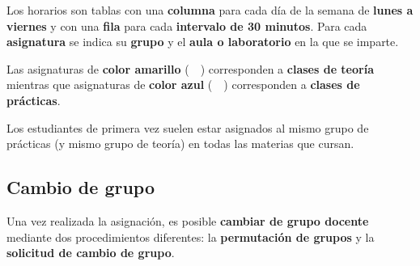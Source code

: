 Los horarios son tablas con una \textbf{columna} para cada día de la semana de \textbf{lunes a viernes} y con una \textbf{fila} para cada \textbf{intervalo de 30 minutos}. Para cada \textbf{asignatura} se indica su \textbf{grupo} y el \textbf{aula o laboratorio} en la que se imparte.

\FloatBarrier
\begin{figure}[htp]
    \centering
\end{figure}
\FloatBarrier

\begin{infoBox}
    Las asignaturas de \textbf{color amarillo} (~\textcolor{colorTimetableTheory}{}~) corresponden a \textbf{clases de teoría} mientras que asignaturas de \textbf{color azul} (~\textcolor{colorTimetablePractice}{}~) corresponden a \textbf{clases de prácticas}.  
\end{infoBox}

\begin{curiosityBox}
    Los estudiantes de primera vez suelen estar asignados al mismo grupo de prácticas (y mismo grupo de teoría) en todas las materias que cursan.
\end{curiosityBox}

\subsection{Cambio de grupo}

Una vez realizada la asignación, es posible \textbf{cambiar de grupo docente} mediante dos procedimientos diferentes: la \textbf{permutación de grupos} y la \textbf{solicitud de cambio de grupo}.



